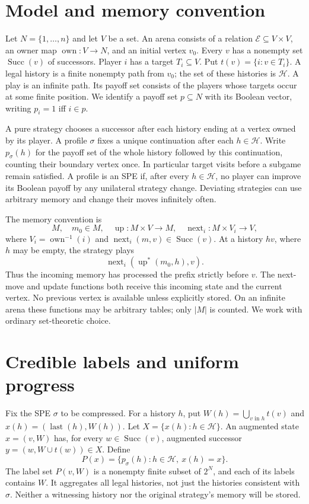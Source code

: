 \documentclass[acmlarge,11pt,screen,nonacm,natbib=false]{acmart}
\newcommand{\own}{\operatorname{own}}
\newcommand{\Succ}{\operatorname{Succ}}
\newcommand{\last}{\operatorname{last}}
\newcommand{\up}{\operatorname{up}}
\newcommand{\nxt}{\operatorname{next}}
\newcommand{\Hist}{\mathcal H}
\theoremstyle{remark}
\begin{document}
\section{Model and memory convention}\label{sec:model}

Let $N=\{1,\ldots,n\}$ and let $V$ be a set. An arena consists of a relation
$\mathcal E\subseteq V\times V$, an owner map $\own:V\to N$, and an initial
vertex $v_0$. Every $v$ has a nonempty set $\Succ(v)$ of successors.
Player $i$ has a target $T_i\subseteq V$. Put $t(v)=\{i:v\in T_i\}$.
A legal history is a finite nonempty path from $v_0$; the set of these
histories is $\Hist$. A play is an infinite path. Its payoff set consists
of the players whose targets occur at some finite position. We identify a
payoff set $p\subseteq N$ with its Boolean vector, writing $p_i=1$ iff $i\in p$.

A pure strategy chooses a successor after each history ending at a vertex
owned by its player. A profile $\sigma$ fixes a unique continuation after
each $h\in\Hist$. Write $p_\sigma(h)$ for the payoff set of the whole
history followed by this continuation, counting their boundary vertex once.
In particular target visits before a subgame remain satisfied. A profile is
an SPE if, after every $h\in\Hist$, no player can improve its Boolean payoff
by any unilateral strategy change. Deviating strategies can use arbitrary
memory and change their moves infinitely often.

The memory convention is
\[
 M,\quad m_0\in M,\quad \up:M\times V\to M,
 \quad \nxt_i:M\times V_i\to V,
\]
where $V_i=\own^{-1}(i)$ and $\nxt_i(m,v)\in\Succ(v)$. At a history $hv$,
where $h$ may be empty, the strategy plays
\[
                    \nxt_i(\up^*(m_0,h),v).
\]
Thus the incoming memory has processed the prefix strictly before $v$.
The next-move and update functions both receive this incoming state and
the current vertex. No previous vertex is available unless explicitly
stored. On an infinite arena these functions may be arbitrary tables;
only $|M|$ is counted. We work with ordinary set-theoretic choice.

\section{Credible labels and uniform progress}\label{sec:labels}

Fix the SPE $\sigma$ to be compressed. For a history $h$, put
$W(h)=\bigcup_{v\text{ in }h}t(v)$ and $x(h)=(\last(h),W(h))$.
Let $X=\{x(h):h\in\Hist\}$. An augmented state $x=(v,W)$ has, for every
$w\in\Succ(v)$, augmented successor $y=(w,W\cup t(w))\in X$.
Define
\[
 P(x)=\{p_\sigma(h):h\in\Hist,\ x(h)=x\}.
\]
The label set $P(v,W)$ is a nonempty finite subset of $2^N$, and each
of its labels contains $W$. It aggregates all legal histories, not just
the histories consistent with $\sigma$. Neither a witnessing history nor
the original strategy's memory will be stored.
\end{document}

